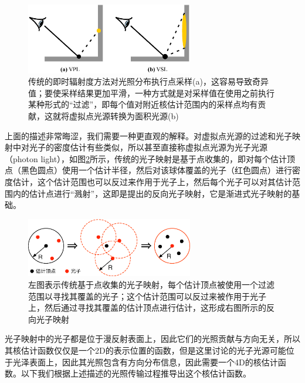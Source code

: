\begin{figure}
	\sidecaption
	\includegraphics[width=0.65\textwidth]{figures/ir/vpl-vs-vsl}
	\caption{传统的即时辐射度方法对光照分布执行点采样(a)，这容易导致奇异值；要使采样结果更加平滑，一种方式就是对采样值在使用之前执行某种形式的“过滤”，即每个值对附近核估计范围内的采样点均有贡献，这就将虚拟点光源转换为面积光源(b)}
	\label{f:ir-vpl-vs-vsl}
\end{figure}

上面的描述非常晦涩，我们需要一种更直观的解释。对虚拟点光源的过滤和光子映射中对光子的密度估计有些类似，所以\cite{a:VirtualSphericalLightsforMany-LightRenderingofGlossyScenes}甚至直接称虚拟点光源为光子光源（photon light），如图\ref{f:ir-reverse-pm}所示，传统的光子映射是基于点收集的，即对每个估计顶点（黑色圆点）使用一个估计半径，然后对该球体覆盖的光子（红色圆点）进行密度估计，这个估计范围也可以反过来作用于光子上，然后每个光子可以对其估计范围内的估计点进行“溅射”，这即是\cite{a:FastFinalGatheringviaReversePhotonMapping}提出的反向光子映射，它是渐进式光子映射的基础。

\begin{figure}
	\sidecaption
	\includegraphics[width=0.65\textwidth]{figures/ir/reverse-pm}
	\caption{左图表示传统基于点收集的光子映射，每个估计顶点被使用一个过滤范围以寻找其覆盖的光子；这个估计范围可以反过来被作用于光子上，然后通过寻找其覆盖的估计顶点进行估计，这形成右图所示的反向光子映射}
	\label{f:ir-reverse-pm}
\end{figure}

光子映射中的光子都是位于漫反射表面上，因此它们的光照贡献与方向无关，所以其核估计函数仅仅是一个2D的表示位置的函数，但是这里讨论的光子光源可能位于光泽表面上，因此其光照包含有方向分布信息，因此需要一个4D的核估计函数。以下我们根据上述描述的光照传输过程推导出这个核估计函数。

